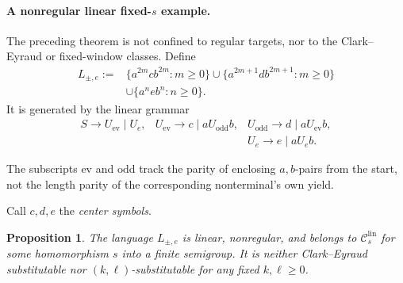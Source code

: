 \documentclass[11pt,a4paper]{article}
\newtheorem{proposition}[theorem]{Proposition}
\theoremstyle{remark}
\theoremstyle{plain}
\newcommand{\lin}{\mathrm{lin}}
\newcommand{\Clin}[1]{\mathcal C_{#1}^{\lin}}
\begin{document}
\paragraph{A nonregular linear \texorpdfstring{fixed-$s$}{fixed-s} example.}

The preceding theorem is not confined to regular targets, nor to the
Clark--Eyraud or fixed-window classes.  Define
\[
\begin{split}
L_{\pm,e}:={}&
\{a^{2m}cb^{2m}:m\ge0\}
\cup
\{a^{2m+1}db^{2m+1}:m\ge0\}\\
&\cup
\{a^neb^n:n\ge0\}.
\end{split}
\]
It is generated by the linear grammar
\[
\begin{array}{lll}
S\to U_{\mathrm{ev}}\mid U_e, &
U_{\mathrm{ev}}\to c\mid aU_{\mathrm{odd}}b, &
U_{\mathrm{odd}}\to d\mid aU_{\mathrm{ev}}b,\\[1mm]
&&U_e\to e\mid aU_eb.
\end{array}
\]

The subscripts $\mathrm{ev}$ and $\mathrm{odd}$ track the parity
of enclosing $a,b$-pairs from the start, not the length parity
of the corresponding nonterminal's own yield.


Call $c,d,e$ the \emph{center symbols}.

\begin{proposition}\label{prop:linear-separator-example}
The language $L_{\pm,e}$ is linear, nonregular, and belongs to
$\Clin{s}$ for some homomorphism $s$ into a finite semigroup.
It is neither Clark--Eyraud substitutable nor
$(k,\ell)$-substitutable for any fixed $k,\ell\ge0$.
\end{proposition}
\end{document}
